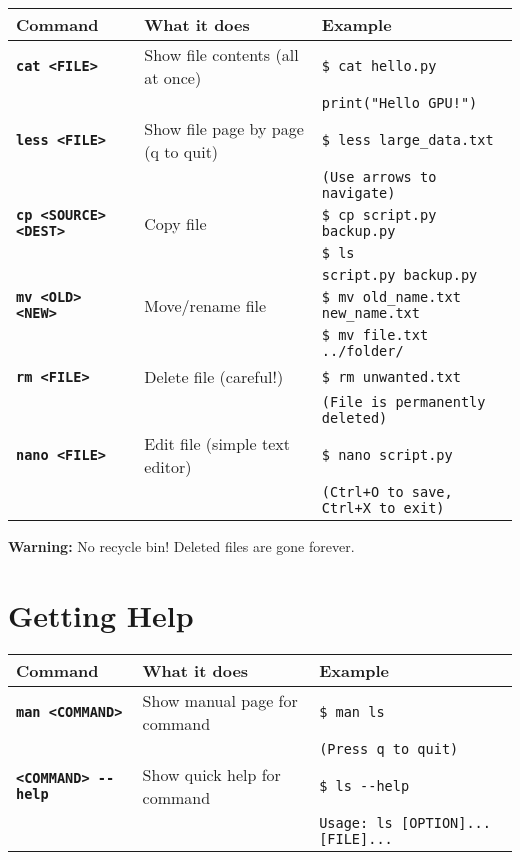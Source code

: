 \documentclass[10pt, a4paper, landscape]{article}
\newcommand{\cmd}[2]{\textcolor{#1}{\textbf{\texttt{#2}}}}
\newcommand{\placeholder}[1]{\texttt{<#1>}}
\begin{document}
\begin{multicols}{2}
\begin{tabular}{@{}p{2.8cm}p{3.5cm}p{3.7cm}@{}}
\toprule
\textbf{Command} & \textbf{What it does} & \textbf{Example} \\
\midrule
\cmd{files}{cat \placeholder{FILE}} & Show file contents (all at once) & \scriptsize\texttt{\$ cat hello.py}\\
& & \scriptsize\texttt{print("Hello GPU!")}\\[1pt]
\cmd{files}{less \placeholder{FILE}} & Show file page by page (q to quit) & \scriptsize\texttt{\$ less large\_data.txt}\\
& & \scriptsize\texttt{(Use arrows to navigate)}\\[1pt]
\cmd{files}{cp \placeholder{SOURCE} \placeholder{DEST}} & Copy file & \scriptsize\texttt{\$ cp script.py backup.py}\\
& & \scriptsize\texttt{\$ ls}\\
& & \scriptsize\texttt{script.py backup.py}\\[1pt]
\cmd{files}{mv \placeholder{OLD} \placeholder{NEW}} & Move/rename file & \scriptsize\texttt{\$ mv old\_name.txt new\_name.txt}\\
& & \scriptsize\texttt{\$ mv file.txt ../folder/}\\[1pt]
\cmd{careful}{rm \placeholder{FILE}} & Delete file (careful!) & \scriptsize\texttt{\$ rm unwanted.txt}\\
& & \scriptsize\texttt{(File is permanently deleted)}\\[1pt]
\cmd{files}{nano \placeholder{FILE}} & Edit file (simple text editor) & \scriptsize\texttt{\$ nano script.py}\\
& & \scriptsize\texttt{(Ctrl+O to save, Ctrl+X to exit)}\\
\bottomrule
\end{tabular}

\vspace{1mm}
\begin{warningbox}
\textbf{Warning:} No recycle bin! Deleted files are gone forever.
\end{warningbox}

\section*{Getting Help}

\begin{tabular}{@{}p{2.8cm}p{3.5cm}p{3.7cm}@{}}
\toprule
\textbf{Command} & \textbf{What it does} & \textbf{Example} \\
\midrule
\cmd{help}{man \placeholder{COMMAND}} & Show manual page for command & \scriptsize\texttt{\$ man ls}\\
& & \scriptsize\texttt{(Press q to quit)}\\[1pt]
\cmd{help}{\placeholder{COMMAND} -{}-help} & Show quick help for command & \scriptsize\texttt{\$ ls -{}-help}\\
& & \scriptsize\texttt{Usage: ls [OPTION]... [FILE]...}\\
\bottomrule
\end{tabular}


\end{multicols}
\end{document}
